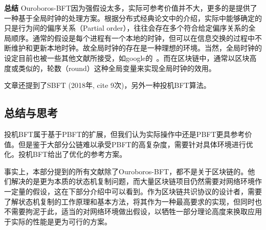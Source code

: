 \textbf{总结}
Ouroboros-BFT因为强假设太多，实际可参考价值并不大，更多的是提供了一种基于全局时钟的处理方案。根据分布式经典论文\cite{lamport1978time}中的介绍，实际中能够确定的只是行为间的偏序关系（Partial order），往往会存在多个符合给定偏序关系的全局顺序。通常的假设是每个进程有一个本地的时钟，但可以在信息交换的过程中不断维护和更新本地时钟。故全局时钟的存在是一种理想的环境。当然，全局时钟的设定目前也被一些其他文献所接受，如google的~\cite{burrows2006chubby,corbett2013spanner}。而在区块链中，通常以区块高度或类似的，轮数（round）这种全局变量来实现全局时钟的效用。

文章还提到了SBFT\cite{golan2018sbft} (2018年, cite 9次)，另外一种投机BFT算法。


\subsection{总结与思考}
投机BFT属于基于PBFT的扩展，但我们认为实际操作中还是PBFT更具参考价值。但是鉴于大部分公链难以承受PBFT的高复杂度，需要针对具体环境进行优化。投机BFT给出了优化的参考方案。

事实上，本部分提到的所有文献除了Ouroboros-BFT，都不是关于区块链的。他们解决的是更为本质的状态机复制问题，而大量区块链项目仍然需要对网络环境作一定量的假设，这在下部分介绍中可以看到。作为区块链共识协议的设计者，需要了解状态机复制的工作原理和基本方法，将其作为一种最高要求的实现，但同时也不需要拘泥于此，适当的对网络环境做出假设，以牺牲一部分理论高度来换取应用于实际的性能是更为可行的方案。